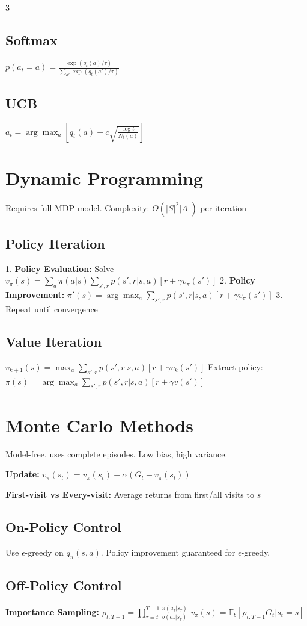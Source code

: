 \documentclass[8pt,landscape,a4paper]{article}
\begin{document}
\begin{multicols*}{3}
\subsection{Softmax}
$p(a_t=a) = \frac{\exp(q_t(a)/\tau)}{\sum_{a'} \exp(q_t(a')/\tau)}$

\subsection{UCB}
$a_t = \arg\max_a \left[ q_t(a) + c\sqrt{\frac{\log t}{N_t(a)}} \right]$

\section{Dynamic Programming}
Requires full MDP model. Complexity: $O(|S|^2|A|)$ per iteration

\subsection{Policy Iteration}
1. \textbf{Policy Evaluation:} Solve $v_\pi(s) = \sum_a \pi(a|s) \sum_{s',r} p(s',r|s,a)[r + \gamma v_\pi(s')]$
2. \textbf{Policy Improvement:} $\pi'(s) = \arg\max_a \sum_{s',r} p(s',r|s,a)[r + \gamma v_\pi(s')]$
3. Repeat until convergence

\subsection{Value Iteration}
$v_{k+1}(s) = \max_a \sum_{s',r} p(s',r|s,a)[r + \gamma v_k(s')]$
Extract policy: $\pi(s) = \arg\max_a \sum_{s',r} p(s',r|s,a)[r + \gamma v(s')]$

\section{Monte Carlo Methods}
Model-free, uses complete episodes. Low bias, high variance.

\textbf{Update:} $v_\pi(s_t) = v_\pi(s_t) + \alpha(G_t - v_\pi(s_t))$

\textbf{First-visit vs Every-visit:} Average returns from first/all visits to $s$

\subsection{On-Policy Control}
Use $\epsilon$-greedy on $q_\pi(s,a)$. Policy improvement guaranteed for $\epsilon$-greedy.

\subsection{Off-Policy Control}
\textbf{Importance Sampling:} $\rho_{t:T-1} = \prod_{\tau=t}^{T-1} \frac{\pi(a_\tau|s_\tau)}{b(a_\tau|s_\tau)}$
$v_\pi(s) = \mathbb{E}_b[\rho_{t:T-1} G_t | s_t=s]$


\end{multicols*}
\end{document}
